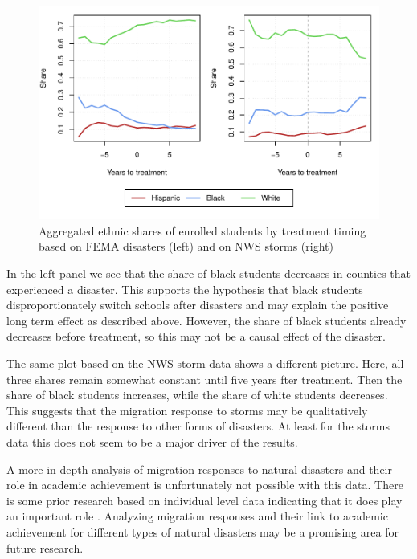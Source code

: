 \begin{figure}[!h]
	\centering
	\includegraphics[scale=1]{"../Code & Data/EthnicComposition.pdf"}
	\caption{Aggregated ethnic shares of enrolled students by treatment timing based on FEMA disasters (left) and on NWS storms (right)}
	\label{EthnicComposition}
\end{figure}

In the left panel we see that the share of black students decreases in counties that experienced a disaster. This supports the hypothesis that black students disproportionately switch schools after disasters and may explain the positive long term effect as described above. However, the share of black students already decreases before treatment, so this may not be a causal effect of the disaster.

The same plot based on the NWS storm data shows a different picture. Here, all three shares remain somewhat constant until five years fter treatment. Then the share of black students increases, while the share of white students decreases. This suggests that the migration response to storms may be qualitatively different than the response to other forms of disasters. At least for the storms data this does not seem to be a major driver of the results.

A more in-depth analysis of migration responses to natural disasters and their role in academic achievement is unfortunately not possible with this data. There is some prior research based on individual level data indicating that it does play an important role \citep[for example][]{Sacerdote_2012}. Analyzing migration responses and their link to academic achievement for different types of natural disasters may be a promising area for future research.

